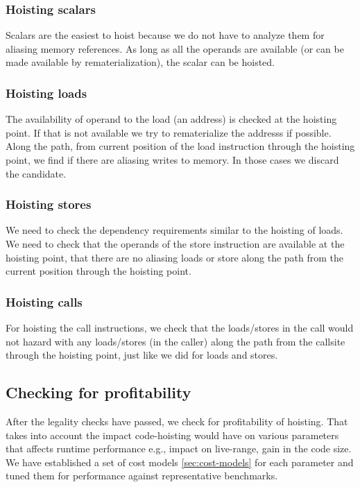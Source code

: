 \documentclass{sig-alternate}
\begin{document}
\subsubsection{Hoisting scalars}
Scalars are the easiest to hoist because we do not have to analyze them for
aliasing memory references. As long as all the operands are available (or can be
made available by rematerialization), the scalar can be hoisted.

\subsubsection{Hoisting loads}
The availability of operand to the load (an address) is checked at the hoisting
point. If that is not available we try to rematerialize the addresss if
possible.  Along the path, from current position of the load instruction through
the hoisting point, we find if there are aliasing writes to memory. In those
cases we discard the candidate.

\subsubsection{Hoisting stores}
We need to check the dependency requirements similar to the hoisting of
loads. We need to check that the operands of the store instruction are available
at the hoisting point, that there are no aliasing loads or store along the path
from the current position through the hoisting point.

\subsubsection{Hoisting calls}
For hoisting the call instructions, we check that the loads/stores in the call
would not hazard with any loads/stores (in the caller) along the path from the
callsite through the hoisting point, just like we did for loads and stores.

\subsection{Checking for profitability}
\label{subsec:profitability}
After the legality checks have passed, we check for profitability of hoisting.
That takes into account the impact code-hoisting would have on various
parameters that affects runtime performance e.g., impact on live-range, gain in
the code size.  We have established a set of cost models \ref{sec:cost-models}
for each parameter and tuned them for performance against representative
benchmarks.
\end{document}
